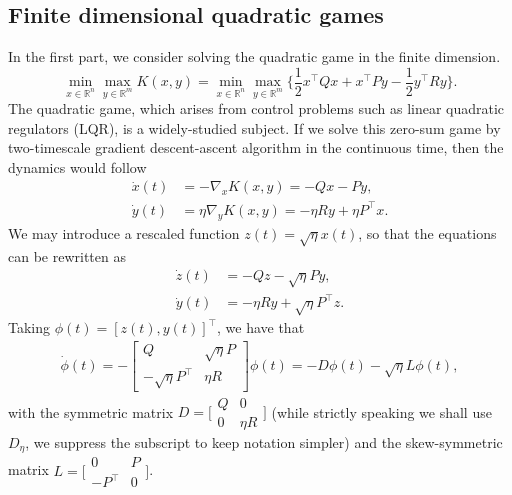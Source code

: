 \documentclass[11pt]{article}
\newcommand{\Rm}{{\mathbb R}}
\newcommand{\1}{\mathds{1}}
\begin{document}
\subsection{Finite dimensional quadratic games}
In the first part, we consider solving the quadratic game in the finite dimension.
    \begin{equation}\label{quadratic}
      \min_{x\in\Rm^n} \max_{y\in \Rm^m} K(x,y) = \min_{x\in\Rm^n} \max_{y\in \Rm^m}\Big\{ \frac{1}{2}x^{\top} Q x + x^{\top} P y - \frac{1}{2}y^{\top} R y\Big\}.
    \end{equation}
The quadratic game, which arises from control problems such as linear quadratic regulators (LQR), is a widely-studied subject. If we solve this zero-sum game by two-timescale gradient descent-ascent algorithm in the continuous time, then the dynamics would follow
    \begin{subequations}\label{alg:gda}
        \begin{align}
            \dot{x}(t) &= -\nabla_x K(x,y) = -Qx-Py,\\
            \dot{y}(t) &= \eta\nabla_y K(x,y) = -\eta Ry+\eta P^{\top} x.
        \end{align}
    \end{subequations}
    We may introduce a rescaled function $z(t) = \sqrt{\eta} x(t)$, so that the equations can be rewritten as 
    \begin{subequations}
        \begin{align}
            \dot{z}(t) &= -Qz-\sqrt{\eta}Py,\\
            \dot{y}(t) &= -\eta Ry+\sqrt{\eta} P^{\top} z.
        \end{align}
    \end{subequations}
    Taking $\phi(t) =[z(t), y(t)]^{\top}$, we have that 
    \begin{equation}\label{eqn:time_t}
    \begin{aligned}
        \dot{\phi}(t) = -\begin{bmatrix}
            Q & \sqrt{\eta}P\\
            -\sqrt{\eta}P^{\top} & \eta R
        \end{bmatrix} \phi(t) = -D \phi(t) - \sqrt{\eta}L \phi(t),
\end{aligned}
\end{equation}
with the symmetric matrix $D = \bigl[\begin{smallmatrix} Q & 0\\ 0 & \eta R \end{smallmatrix}\bigr]$ (while strictly speaking we shall use $D_{\eta}$, we suppress the subscript to keep notation simpler) and the skew-symmetric matrix $L = \bigl[\begin{smallmatrix} 0 & P\\ - P^{\top} & 0 \end{smallmatrix}\bigr]$.  
\end{document}
